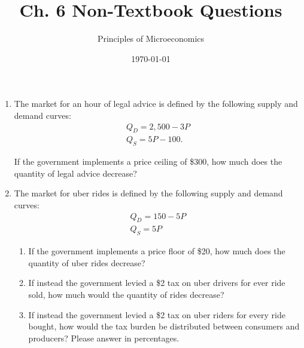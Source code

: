 \documentclass{article}
\title{Ch. 6 Non-Textbook Questions}
\author{Principles of Microeconomics}
\date{\today}
\begin{document}
\maketitle

\begin{enumerate}

\item The market for an hour of legal advice is defined by the following supply and demand curves:
	\begin{gather*}
	Q_D = 2,500 - 3P \\
	Q_S = 5P - 100.
	\end{gather*}
	
	If the government implements a price ceiling of \$300, how much does the quantity of legal advice decrease?
	
\item The market for uber rides is defined by the following supply and demand curves:
	\begin{gather*}
	Q_D = 150 - 5P \\
	Q_S = 5P
	\end{gather*}
	
	\begin{enumerate}
	
	\item If the government implements a price floor of \$20, how much does the quantity of uber rides decrease?
	
	\item If instead the government levied a \$2 tax on uber drivers for ever ride sold, how much would the quantity of rides decrease?
	
	\item If instead the government levied a \$2 tax on uber riders for every ride bought, how would the tax burden be distributed between consumers and producers? Please answer in percentages.
	
	\end{enumerate}
	
%	
%	
%	
%	
%	
%	
	

\end{enumerate}
\end{document}
